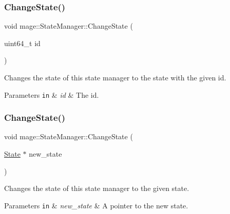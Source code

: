\subsubsection{\texorpdfstring{Change\+State()}{ChangeState()}\hspace{0.1cm}{\footnotesize\ttfamily [1/2]}}
{\footnotesize\ttfamily void mage\+::\+State\+Manager\+::\+Change\+State (\begin{DoxyParamCaption}\item[{uint64\+\_\+t}]{id }\end{DoxyParamCaption})}

Changes the state of this state manager to the state with the given id.


\begin{DoxyParams}[1]{Parameters}
\mbox{\tt in}  & {\em id} & The id. \\
\hline
\end{DoxyParams}
\hypertarget{classmage_1_1_state_manager_acb8123a0682394a7b7af001e6c5e25fe}{}\label{classmage_1_1_state_manager_acb8123a0682394a7b7af001e6c5e25fe} 
\subsubsection{\texorpdfstring{Change\+State()}{ChangeState()}\hspace{0.1cm}{\footnotesize\ttfamily [2/2]}}
{\footnotesize\ttfamily void mage\+::\+State\+Manager\+::\+Change\+State (\begin{DoxyParamCaption}\item[{\hyperlink{classmage_1_1_state}{State} $\ast$}]{new\+\_\+state }\end{DoxyParamCaption})\hspace{0.3cm}{\ttfamily [private]}}

Changes the state of this state manager to the given state.


\begin{DoxyParams}[1]{Parameters}
\mbox{\tt in}  & {\em new\+\_\+state} & A pointer to the new state. \\
\hline
\end{DoxyParams}
\hypertarget{classmage_1_1_state_manager_ab3a37b1ef0d2e9960ff4c98747c64d3f}{}\label{classmage_1_1_state_manager_ab3a37b1ef0d2e9960ff4c98747c64d3f} 
